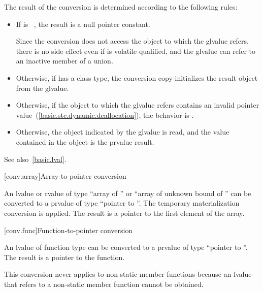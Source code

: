 \pnum
The result of the conversion is determined according to the
following rules:
\begin{itemize}

\item If  is \cv{}~, the result is a
null pointer constant.
\begin{note}
Since the conversion does not access the object to which the glvalue refers,
there is no side effect even if  is volatile-qualified, and
the glvalue can refer to an inactive member of a union.
\end{note}

\item Otherwise, if  has a class
type, the conversion copy-initializes the result object from
the glvalue.

\item Otherwise, if the object to which the glvalue refers contains an invalid
pointer value~(\ref{basic.stc.dynamic.deallocation}), the behavior is
.

\item Otherwise, the object indicated by the glvalue is read,
and the value contained in the object is the prvalue result.
\end{itemize}

\pnum
\begin{note}
See also~\ref{basic.lval}.
\end{note}

[conv.array]{Array-to-pointer conversion}

\pnum
{}%
%
%
An lvalue or rvalue of type ``array of  '' or ``array
of unknown bound of '' can be converted to a prvalue of type
``pointer to ''.
The temporary materialization conversion is applied.
The result is a pointer to the first element of the array.

[conv.func]{Function-to-pointer conversion}

\pnum
{}%
An lvalue of function type  can be converted to a prvalue of
type ``pointer to ''. The result is a pointer to the
function.
\begin{footnote}
This conversion never applies to non-static member functions because an
lvalue that refers to a non-static member function cannot be obtained.
\end{footnote}

